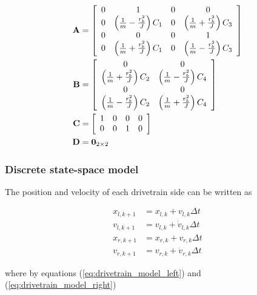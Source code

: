 \begin{align}
  \mathbf{A} &= \left[
  \begin{array}{cccc}
    0 & 1 & 0 & 0 \\
    0 & \left(\frac{1}{m} - \frac{r_b^2}{J}\right) C_1 & 0 & \left(\frac{1}{m} + \frac{r_b^2}{J}\right) C_3 \\
    0 & 0 & 0 & 1 \\
    0 & \left(\frac{1}{m} + \frac{r_b^2}{J}\right) C_1 & 0 & \left(\frac{1}{m} - \frac{r_b^2}{J}\right) C_3
  \end{array}
  \right] \\
  \mathbf{B} &= \left[
  \begin{array}{cc}
    0 & 0 \\
    \left(\frac{1}{m} + \frac{r_b^2}{J}\right) C_2 & \left(\frac{1}{m} - \frac{r_b^2}{J}\right) C_4 \\
    0 & 0 \\
    \left(\frac{1}{m} - \frac{r_b^2}{J}\right) C_2 & \left(\frac{1}{m} + \frac{r_b^2}{J}\right) C_4
  \end{array}
  \right] \\
  \mathbf{C} &= \left[
  \begin{array}{cccc}
    1 & 0 & 0 & 0 \\
    0 & 0 & 1 & 0 \\
  \end{array}
  \right] \\
  \mathbf{D} &= \mathbf{0}_{2 \times 2}
\end{align}

\subsubsection{Discrete state-space model}

The position and velocity of each drivetrain side can be written as

\begin{align}
  x_{l,k+1} &= x_{l,k} + v_{l,k} \Delta t \label{eq:drivetrain_disc_ss_posl} \\
  v_{l,k+1} &= v_{l,k} + \dot{v}_{l,k} \Delta t
    \label{eq:drivetrain_disc_ss_vell} \\
  x_{r,k+1} &= x_{r,k} + v_{r,k} \Delta t \label{eq:drivetrain_disc_ss_posr} \\
  v_{r,k+1} &= v_{r,k} + \dot{v}_{r,k} \Delta t
    \label{eq:drivetrain_disc_ss_velr}
\end{align}

where by equations (\ref{eq:drivetrain_model_left}) and
(\ref{eq:drivetrain_model_right})

